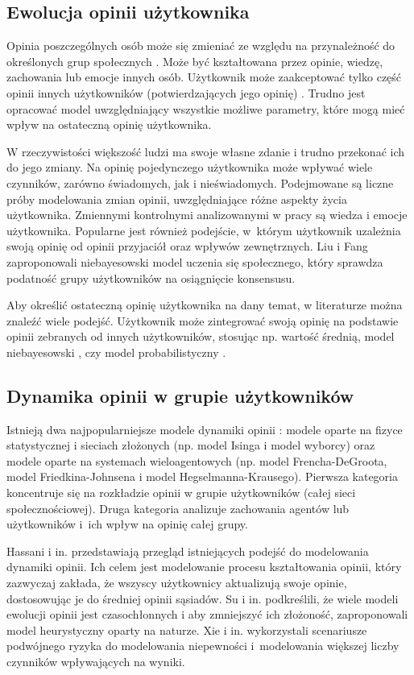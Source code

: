 \subsection{Ewolucja opinii użytkownika}

Opinia poszczególnych osób może się zmieniać ze względu na przynależność do określonych grup społecznych \cite{pedraza}. Może być kształtowana przez opinie, wiedzę, zachowania lub emocje innych osób. Użytkownik może zaakceptować tylko część opinii innych użytkowników (potwierdzających jego opinię) \cite{hou}. Trudno jest opracować model uwzględniający wszystkie możliwe parametry, które mogą mieć wpływ na ostateczną opinię użytkownika.

W rzeczywistości większość ludzi ma swoje własne zdanie i trudno przekonać ich do jego zmiany. Na opinię pojedynczego użytkownika może wpływać wiele czynników, zarówno świadomych, jak i nieświadomych. Podejmowane są liczne próby modelowania zmian opinii, uwzględniające różne aspekty życia użytkownika. Zmiennymi kontrolnymi analizowanymi w pracy \cite{sobkowicz} są wiedza i emocje użytkownika. Popularne jest również podejście, w~którym użytkownik uzależnia swoją opinię od opinii przyjaciół oraz wpływów zewnętrznych. Liu i Fang \cite{liu} zaproponowali niebayesowski model uczenia się społecznego, który sprawdza podatność grupy użytkowników na osiągnięcie konsensusu.

Aby określić ostateczną opinię użytkownika na dany temat, w literaturze można znaleźć wiele podejść. Użytkownik może zintegrować swoją opinię na podstawie opinii zebranych od innych użytkowników, stosując np. wartość średnią, model niebayesowski \cite{liu}, czy model probabilistyczny \cite{deng}.

\subsection{Dynamika opinii w grupie użytkowników}

Istnieją dwa najpopularniejsze modele dynamiki opinii \cite{tian}: modele oparte na fizyce statystycznej i sieciach złożonych (np. model Isinga i model wyborcy) oraz modele oparte na systemach wieloagentowych \cite{proskurnikov} (np. model Frencha-DeGroota, model Friedkina-Johnsena i model Hegselmanna-Krausego). Pierwsza kategoria koncentruje się na rozkładzie opinii w grupie użytkowników (całej sieci społecznościowej). Druga kategoria analizuje zachowania agentów lub użytkowników i~ich wpływ na opinię całej grupy.

Hassani i in. \cite{hassani} przedstawiają przegląd istniejących  podejść do modelowania dynamiki opinii. Ich celem jest modelowanie procesu kształtowania opinii, który zazwyczaj zakłada, że wszyscy użytkownicy aktualizują swoje opinie, dostosowując je do średniej opinii sąsiadów. Su i in. \cite{su} podkreślili, że wiele modeli ewolucji opinii jest czasochłonnych i aby zmniejszyć ich złożoność, zaproponowali model heurystyczny oparty na naturze. Xie i in. \cite{xie} wykorzystali scenariusze podwójnego ryzyka do modelowania niepewności i~modelowania większej liczby czynników wpływających na wyniki.

